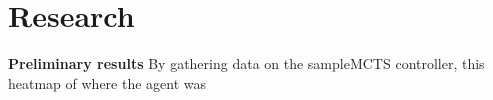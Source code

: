 \documentclass[journal]{IEEEtran}
\begin{document}














	
\section{Research}
	\textbf{Preliminary results}
		By gathering data on the sampleMCTS controller, this heatmap of where the agent was 


	 







\end{document}
